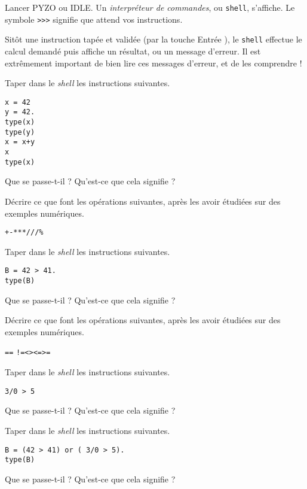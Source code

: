 
Lancer PYZO ou IDLE. Un \emph{interpréteur de commandes}, ou \texttt{shell}, s'affiche. 
Le symbole \texttt{>}\texttt{>}\texttt{>} signifie que \python{} attend vos instructions. 

Sitôt une instruction tapée et validée (par la touche \og Entrée \fg{}), le \texttt{shell} effectue le calcul demandé puis affiche un résultat, ou un message d'erreur. 
Il est extrêmement important de bien lire ces messages d'erreur, et de les comprendre ! 

\medskip{}

\question{} Taper dans le \emph{shell} les instructions suivantes. 
\begin{verbatim}
x = 42
y = 42.
type(x)
type(y)
x = x+y
x
type(x)
\end{verbatim}
Que se passe-t-il ? Qu'est-ce que cela signifie ?

\medskip{}

\question{} Décrire ce que font les opérations suivantes, après les avoir étudiées sur des exemples numériques.
\begin{center}
  \texttt{+}\qquad \texttt{-}\qquad \texttt{*}\qquad \texttt{**}\qquad \texttt{/}\qquad \texttt{//}\qquad \texttt{\%}
\end{center}


\question{} Taper dans le \emph{shell} les instructions suivantes. 
\begin{verbatim}
B = 42 > 41.
type(B)
\end{verbatim}
Que se passe-t-il ? Qu'est-ce que cela signifie ?

\medskip{}

\question{} Décrire ce que font les opérations suivantes, après les avoir étudiées sur des exemples numériques.
\begin{center}
  \texttt{==} {} \qquad{} \texttt{!=}\qquad\texttt{<}\qquad\texttt{>}\qquad\texttt{<=}\qquad\texttt{>=}
\end{center}

\medskip{}

\question{} Taper dans le \emph{shell} les instructions suivantes. 
\begin{verbatim}
3/0 > 5
\end{verbatim}
Que se passe-t-il ? Qu'est-ce que cela signifie ?
\medskip{}

\question{} Taper dans le \emph{shell} les instructions suivantes. 
\begin{verbatim}
B = (42 > 41) or ( 3/0 > 5).
type(B)
\end{verbatim}
Que se passe-t-il ? Qu'est-ce que cela signifie ?

